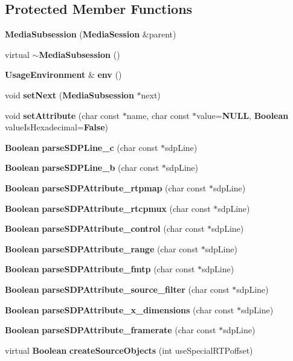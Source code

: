 \subsection*{Protected Member Functions}
\begin{DoxyCompactItemize}
\item 
{\bf Media\+Subsession} ({\bf Media\+Session} \&parent)
\item 
virtual {\bf $\sim$\+Media\+Subsession} ()
\item 
{\bf Usage\+Environment} \& {\bf env} ()
\item 
void {\bf set\+Next} ({\bf Media\+Subsession} $\ast$next)
\item 
void {\bf set\+Attribute} (char const $\ast$name, char const $\ast$value={\bf N\+U\+L\+L}, {\bf Boolean} value\+Is\+Hexadecimal={\bf False})
\item 
{\bf Boolean} {\bf parse\+S\+D\+P\+Line\+\_\+c} (char const $\ast$sdp\+Line)
\item 
{\bf Boolean} {\bf parse\+S\+D\+P\+Line\+\_\+b} (char const $\ast$sdp\+Line)
\item 
{\bf Boolean} {\bf parse\+S\+D\+P\+Attribute\+\_\+rtpmap} (char const $\ast$sdp\+Line)
\item 
{\bf Boolean} {\bf parse\+S\+D\+P\+Attribute\+\_\+rtcpmux} (char const $\ast$sdp\+Line)
\item 
{\bf Boolean} {\bf parse\+S\+D\+P\+Attribute\+\_\+control} (char const $\ast$sdp\+Line)
\item 
{\bf Boolean} {\bf parse\+S\+D\+P\+Attribute\+\_\+range} (char const $\ast$sdp\+Line)
\item 
{\bf Boolean} {\bf parse\+S\+D\+P\+Attribute\+\_\+fmtp} (char const $\ast$sdp\+Line)
\item 
{\bf Boolean} {\bf parse\+S\+D\+P\+Attribute\+\_\+source\+\_\+filter} (char const $\ast$sdp\+Line)
\item 
{\bf Boolean} {\bf parse\+S\+D\+P\+Attribute\+\_\+x\+\_\+dimensions} (char const $\ast$sdp\+Line)
\item 
{\bf Boolean} {\bf parse\+S\+D\+P\+Attribute\+\_\+framerate} (char const $\ast$sdp\+Line)
\item 
virtual {\bf Boolean} {\bf create\+Source\+Objects} (int use\+Special\+R\+T\+Poffset)
\end{DoxyCompactItemize}
